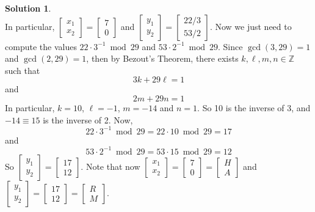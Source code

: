 \documentclass[11pt]{article}
\theoremstyle{definition}\newtheorem{definition}{Definition}
\theoremstyle{definition}\newtheorem{question}{Question}
\theoremstyle{definition}\newtheorem*{solution}{Solution}
\theoremstyle{definition}\newtheorem{example}{Example}
\theoremstyle{definition}\newtheorem{notation}{Notation}
\theoremstyle{theorem}\newtheorem{theorem}{Theorem}
\theoremstyle{theorem}\newtheorem{corollary}{Corollary}
\theoremstyle{theorem}\newtheorem{lemma}{Lemma}
\theoremstyle{theorem}\newtheorem{proposition}{Proposition}
\newcommand{\Z}{\mathbb{Z}}
\begin{document}
\begin{solution}
\begin{equation*}
    \end{equation*}
    In particular, $\begin{bmatrix} x_1 \\ x_2 \end{bmatrix} = \begin{bmatrix} 7 \\ 0 \end{bmatrix}$ and $\begin{bmatrix} y_1 \\ y_2 \end{bmatrix} = \begin{bmatrix} 22/3 \\ 53/2 \end{bmatrix}$. Now we just need to compute the values $22 \cdot 3^{-1} \bmod 29$ and $53 \cdot 2^{-1} \bmod 29$. Since $\gcd(3, 29) = 1$ and $\gcd(2, 29) = 1$, then by Bezout's Theorem, there exists $k, \ell, m, n \in \Z$ such that
    \begin{equation*}
        3k + 29\ell = 1
    \end{equation*}
    and
    \begin{equation*}
        2m + 29n = 1
    \end{equation*}
    In particular, $k = 10$, $\ell = -1$, $m = -14$ and $n = 1$. So 10 is the inverse of 3, and $-14 \equiv 15$ is the inverse of 2. Now,
    \begin{equation*}
        22 \cdot 3^{-1} \bmod 29 = 22 \cdot 10 \bmod 29 = 17
    \end{equation*}
    and
    \begin{equation*}
        53 \cdot 2^{-1} \bmod 29 = 53 \cdot 15 \bmod 29 = 12
    \end{equation*}
    So $\begin{bmatrix} y_1 \\ y_2 \end{bmatrix} = \begin{bmatrix} 17 \\ 12 \end{bmatrix}$. Note that now $\begin{bmatrix} x_1 \\ x_2 \end{bmatrix} = \begin{bmatrix} 7 \\ 0 \end{bmatrix} = \begin{bmatrix} H \\ A \end{bmatrix} $ and $\begin{bmatrix} y_1 \\ y_2 \end{bmatrix} = \begin{bmatrix} 17 \\ 12 \end{bmatrix} = \begin{bmatrix} R \\ M \end{bmatrix}$.


\end{solution}
\end{document}
